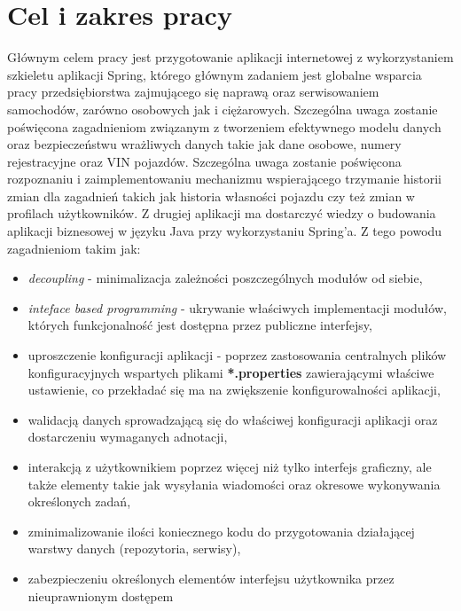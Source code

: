 \section{Cel i zakres pracy}
		Głównym celem pracy jest przygotowanie aplikacji internetowej z wykorzystaniem szkieletu aplikacji Spring, którego głównym zadaniem
	jest globalne wsparcia pracy przedsiębiorstwa zajmującego się naprawą oraz serwisowaniem samochodów, zarówno osobowych jak i ciężarowych.
	Szczególna uwaga zostanie poświęcona zagadnieniom związanym z tworzeniem efektywnego modelu danych oraz bezpieczeństwu wrażliwych danych takie jak dane osobowe, numery rejestracyjne oraz VIN pojazdów. Szczególna uwaga zostanie poświęcona rozpoznaniu i zaimplementowaniu mechanizmu wspierającego trzymanie
	historii zmian dla zagadnień takich jak historia własności pojazdu czy też zmian w profilach użytkowników.
		Z drugiej aplikacji ma dostarczyć wiedzy o budowania aplikacji biznesowej w języku Java przy wykorzystaniu Spring'a. Z tego powodu zagadnieniom takim jak:
	\begin{itemize}
		\item \textit{decoupling} - minimalizacja zależności poszczególnych modułów od siebie,
		\item \textit{inteface based programming} - ukrywanie właściwych implementacji modułów, których funkcjonalność jest dostępna przez publiczne interfejsy,
		\item uproszczenie konfiguracji aplikacji - poprzez zastosowania centralnych plików konfiguracyjnych wspartych plikami \textbf{*.properties} zawierającymi
		właściwe ustawienie, co przekładać się ma na zwiększenie konfigurowalności aplikacji,
		\item walidacją danych sprowadzającą się do właściwej konfiguracji aplikacji oraz dostarczeniu wymaganych adnotacji,
		\item interakcją z użytkownikiem poprzez więcej niż tylko interfejs graficzny, ale także elementy takie jak wysyłania wiadomości oraz okresowe wykonywania określonych
		zadań,
		\item zminimalizowanie ilości koniecznego kodu do przygotowania działającej warstwy danych (repozytoria, serwisy),
		\item zabezpieczeniu określonych elementów interfejsu użytkownika przez nieuprawnionym dostępem
	\end{itemize}
		
